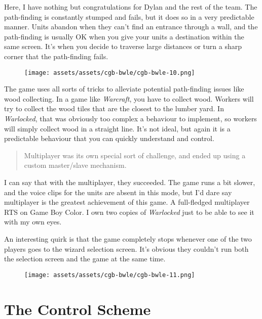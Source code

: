\documentclass{book}
\begin{document}
Here, I have nothing but congratulations for Dylan and the rest of the team. The path-finding is constantly stumped and fails, but it does so in a very predictable manner. Units abandon when they can’t find an entrance through a wall, and the path-finding is usually OK when you give your units a destination within the same screen. It’s when you decide to traverse large distances or turn a sharp corner that the path-finding fails.

\begin{figure}[hbt]
\vskip 10pt
\centering \texttt{[image: assets/assets/cgb-bwle/cgb-bwle-10.png]}
\vskip 6pt
\end{figure}

The game uses all sorts of tricks to alleviate potential path-finding issues like wood collecting. In a game like \emph{Warcraft}, you have to collect wood. Workers will try to collect the wood tiles that are the closest to the lumber yard. In \emph{Warlocked}, that was obviously too complex a behaviour to implement, so workers will simply collect wood in a straight line. It’s not ideal, but again it is a predictable behaviour that you can quickly understand and control.

\begin{quote}
Multiplayer was its own special sort of challenge, and ended up using a custom master/slave mechanism.
\end{quote} \par

I can say that with the multiplayer, they succeeded. The game runs a bit slower, and the voice clips for the units are absent in this mode, but I’d dare say multiplayer is the greatest achievement of this game. A full-fledged multiplayer RTS on Game Boy Color. I own two copies of \emph{Warlocked} just to be able to see it with my own eyes.

An interesting quirk is that the game completely stops whenever one of the two players goes to the wizard selection screen. It’s obvious they couldn’t run both the selection screen and the game at the same time.

\begin{figure}[hbt]
\vskip 10pt
\centering \texttt{[image: assets/assets/cgb-bwle/cgb-bwle-11.png]}
\vskip 6pt
\end{figure}

\FloatBarrier\needspace{5pt}\section*{The Control Scheme}\nopagebreak[4]
\end{document}

